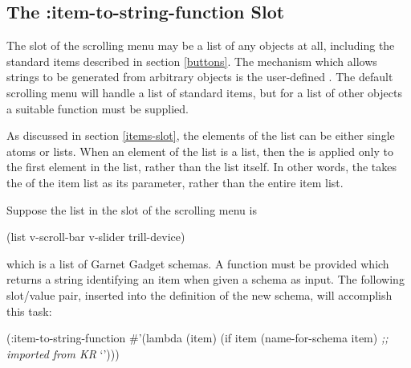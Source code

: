\begin{group}
\section{The :item-to-string-function Slot}
\label{sm-ex}
The  slot of the scrolling menu may be a list of any objects at all,
including the standard items described in section \ref{buttons}.  The
mechanism which allows strings to be generated from arbitrary objects is the
user-defined .  The default scrolling menu will
handle a list of standard items, but for a list of other objects a suitable
function must be supplied.

As discussed in section \ref{items-slot}, the elements of the  list
can be either single atoms or lists.  When an element of the  list
is a list, then the  is applied only to the
first element in the list, rather than the list itself.  In other words, the
 takes the  of the item list as its
parameter, rather than the entire item list.

Suppose the list in the  slot of the scrolling menu is
\vspace{.5 line}
\begin{programexample}
(list v-scroll-bar v-slider trill-device)
\end{programexample}
\vspace{.5 line}
which is a list of Garnet Gadget schemas.
A function must be provided which returns a string identifying an item when
given a schema as input.  The following slot/value pair, inserted into the
definition of the new schema, will accomplish this task:
\vspace{.5 line}
\begin{programexample}
(:item-to-string-function \#'(lambda (item)
                              (if item
                                  (name-for-schema item)  {\it ;; imported from KR}
                                  `')))
\end{programexample}
\end{group}
